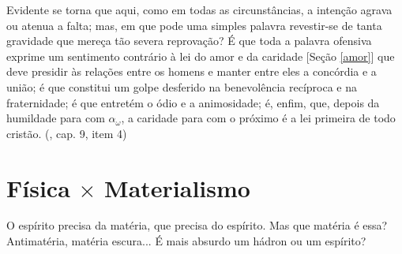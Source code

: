 \documentclass[12pt,a4paper]{article}
\begin{document}
			Evidente se torna que aqui, como em todas as circunst\^ancias, a inten\c{c}\~ao agrava ou atenua a falta; mas, em que pode uma simples palavra revestir-se de tanta gravidade que mere\c{c}a t\~ao severa reprova\c{c}\~ao? \'E que toda a palavra ofensiva\cite{palavrasAtiradas} exprime um sentimento contr\'ario \`a lei do amor e da caridade [Se\c{c}\~ao \ref{amor}] que deve presidir \`as rela\c{c}\~oes entre os homens e manter entre eles a conc\'ordia e a uni\~ao\cite{unidade}; \'e que constitui um golpe desferido na benevol\^encia rec\'iproca e na fraternidade; \'e que entret\'em o \'odio e a animosidade; \'e, enfim, que, depois da humildade para com $ \alpha_\omega $, a caridade para com o pr\'oximo \'e a lei primeira de todo crist\~ao. (\cite{ese}, cap. 9, item 4)

	\section{F\'isica $ \times $ Materialismo}\label{fisica}
		\begin{flushright}
		\end{flushright}

		O esp\'irito precisa da mat\'eria, que precisa do esp\'irito. Mas que mat\'eria \'e essa? Antimat\'eria, mat\'eria escura... \'E mais absurdo um h\'adron ou um esp\'irito?
\end{document}
